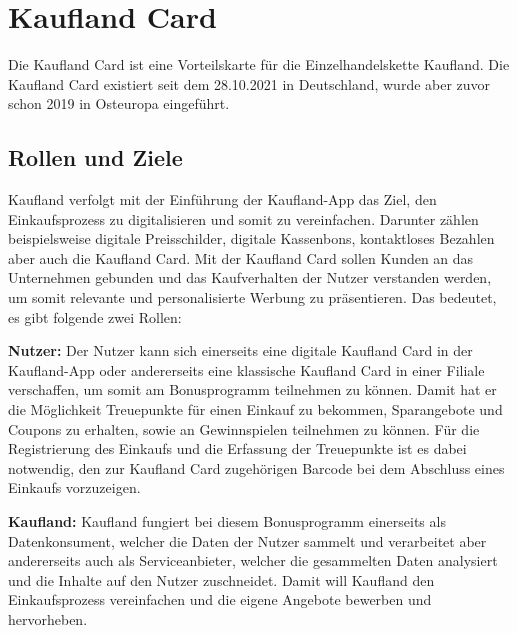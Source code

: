 \section{Kaufland Card}
Die Kaufland Card ist eine Vorteilskarte für die Einzelhandelskette Kaufland. Die Kaufland Card existiert seit dem 28.10.2021 in Deutschland, wurde aber zuvor schon 2019 in Osteuropa eingeführt.

\subsection{Rollen und Ziele}
Kaufland verfolgt mit der Einführung der Kaufland-App das Ziel, den Einkaufsprozess zu digitalisieren und somit zu vereinfachen. Darunter zählen beispielsweise digitale Preisschilder, digitale Kassenbons, kontaktloses Bezahlen aber auch die Kaufland Card. \cite{Kaufland_Ziele} Mit der Kaufland Card sollen Kunden an das Unternehmen gebunden und das Kaufverhalten der Nutzer verstanden werden, um somit relevante und personalisierte Werbung zu präsentieren. \cite{Kaufland_Datenschutz} Das bedeutet, es gibt folgende zwei Rollen: \newline

\noindent \textbf{Nutzer:} Der Nutzer kann sich einerseits eine digitale Kaufland Card in der Kaufland-App oder andererseits eine klassische Kaufland Card in einer Filiale verschaffen, um somit am Bonusprogramm teilnehmen zu können. Damit hat er die Möglichkeit Treuepunkte für einen Einkauf zu bekommen, Sparangebote und Coupons zu erhalten, sowie an Gewinnspielen teilnehmen zu können. Für die Registrierung des Einkaufs und die Erfassung der Treuepunkte ist es dabei notwendig, den zur Kaufland Card zugehörigen Barcode bei dem Abschluss eines Einkaufs vorzuzeigen. \newline

\noindent \textbf{Kaufland:} Kaufland fungiert bei diesem Bonusprogramm einerseits als Datenkonsument, welcher die Daten der Nutzer sammelt und verarbeitet aber andererseits auch als Serviceanbieter, welcher die gesammelten Daten analysiert und die Inhalte auf den Nutzer zuschneidet. Damit will Kaufland den Einkaufsprozess vereinfachen und die eigene Angebote bewerben und hervorheben.

